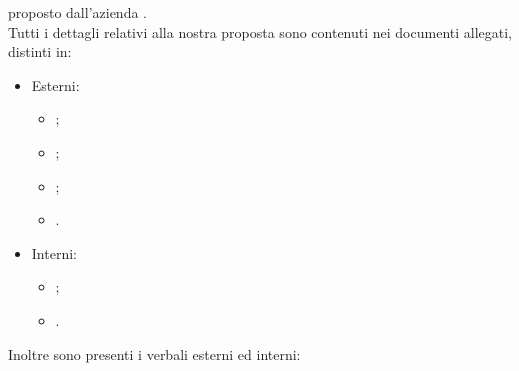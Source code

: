 \documentclass[a4paper, oneside, openany, dvipsnames, table,11pt]{letter}
\begin{document}
\begin{letter}
\begin{center}
           \textbf{\NomeProgetto{}} 
        \end{center}
        proposto dall'azienda \textbf{\proponente{}}.\\
        Tutti i dettagli relativi alla nostra proposta sono contenuti nei documenti allegati, distinti in:
        \begin{itemize}
            \item Esterni:
            \begin{itemize}
                \item \AdRv{};
                \item \Gv{};
                \item \PdPv{};
                \item \PdQv{}.
            \end{itemize}
            \item Interni:
            \begin{itemize}
                \item \NdPv{};
                \item \SdFv{}.
            \end{itemize}
        \end{itemize}
        Inoltre sono presenti i verbali esterni ed interni:
        \begin{itemize}
            

\end{itemize}
\end{letter}
\end{document}
